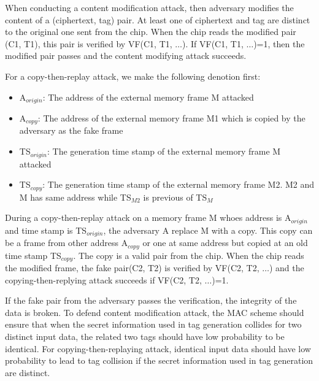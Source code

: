 \documentclass{article}
\begin{document}
When conducting a content modification attack, then adversary modifies the content of a (ciphertext, tag) pair. At least one of ciphertext and tag are distinct to the original one sent from the chip. When the chip reads the modified pair (C1, T1), this pair is verified by VF(C1, T1, $\ldots$). If VF(C1, T1, $\ldots$)=1, then the modified pair passes and the content modifying attack succeeds. 

For a copy-then-replay attack, we make the following denotion first:
\begin{itemize}
	\item A$_{origin}$: The address of the external memory frame M attacked 
	\item A$_{copy}$: The address of the external memory frame M1 which is copied by the adversary as the fake frame
	\item TS$_{origin}$: The generation time stamp of the external memory frame M attacked
	\item TS$_{copy}$: The generation time stamp of the external memory frame M2. M2 and M has same address while TS$_{M2}$ is previous of TS$_M$ 
\end{itemize}
During a copy-then-replay attack on a memory frame M whoes address is A$_{origin}$ and time stamp is TS$_{origin}$, the adversary A replace M with a copy. This copy can be a frame from other address A$_{copy}$ or one at same address but copied at an old time stamp TS$_{copy}$. The copy is a valid pair from the chip. 
When the chip reads the modified frame, the fake pair(C2, T2) is verified by VF(C2, T2, $\ldots$) and the copying-then-replying attack succeeds if VF(C2, T2, $\ldots$)=1.  

If the fake pair from the adversary passes the verification, the integrity of the data is broken. To defend content modification attack, the MAC scheme should ensure that when the secret information used in tag generation collides for two distinct input data, the related two tags should have low probability to be identical. For copying-then-replaying attack, identical input data should have low probability to lead to tag collision if the secret information used in tag generation are distinct. 

\end{document}
